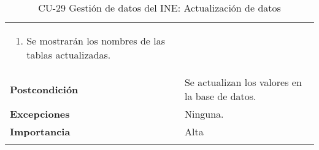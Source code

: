 \begin{longtable}[t]{@{}ll@{}}
\begin{minipage}[t]{0.71\columnwidth}
\begin{enumerate}
\item
Se mostrarán los nombres de las tablas actualizadas.
\end{enumerate}\strut
\end{minipage}\tabularnewline
\begin{minipage}[t]{0.23\columnwidth}\raggedright\strut
\textbf{Postcondición}\strut
\end{minipage} & \begin{minipage}[t]{0.71\columnwidth}\raggedright\strut
Se actualizan los valores en la base de datos.\strut
\end{minipage}\tabularnewline
\begin{minipage}[t]{0.23\columnwidth}\raggedright\strut
\textbf{Excepciones}\strut
\end{minipage} & \begin{minipage}[t]{0.71\columnwidth}\raggedright\strut
Ninguna. \strut
\end{minipage}\tabularnewline
\begin{minipage}[t]{0.23\columnwidth}\raggedright\strut
\textbf{Importancia}\strut
\end{minipage} & \begin{minipage}[t]{0.71\columnwidth}\raggedright\strut
Alta\strut
\end{minipage}\tabularnewline
\bottomrule
\caption{CU-29 Gestión de datos del INE: Actualización de datos}
\end{longtable}


